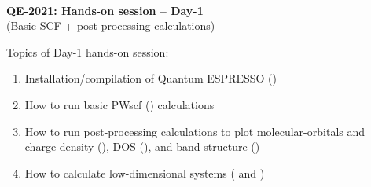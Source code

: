 \documentclass[landscape]{foils}
\begin{document}

\blue
~\\
\vspace*{4cm}
\MyLogo{~}
\vspace{5em}
\begin{center}
  {\burgundy\LARGE\bf QE-2021: Hands-on session -- Day-1}\\[2em]
  {\burgundy\LARGE (Basic SCF + post-processing calculations)}
  ~\\[1.5em]  
\end{center}

Topics of Day-1 hands-on session:
\begin{enumerate}
\item Installation/compilation of Quantum ESPRESSO ()
\item How to run basic PWscf () calculations
\item How to run post-processing calculations to plot
  molecular-orbitals and charge-density (), DOS
  (), and band-structure ()
\item How to calculate low-dimensional systems ( and
  )
\end{enumerate}
    
\end{document}

